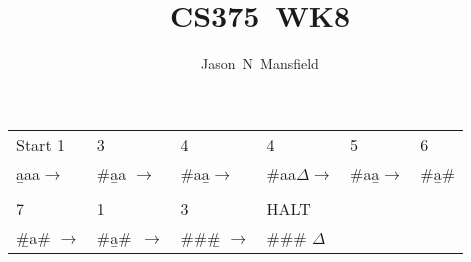 \documentclass[10pt]{article}
\title{CS375~WK8}
\author{Jason~N~Mansfield}
\begin{document}
\section{}
\subsection{}

\begin{tabular}{ l l l l l l }  
  Start 1&3&4&4&5&6           \\         
\b{a}aa$\rightarrow$ & \#\b{a}a $\rightarrow$&\#a\b{a}$\rightarrow$ & \#aa\b{$\Delta$}$\rightarrow$& \#a\b{a}$\rightarrow$&\#\b{a}\#\\
&&&&&\\%
7&1&3&HALT&&\\
\b{\#}a\# $\rightarrow$&\#\b{a}\#\ $\rightarrow$&\#\#\b{\#} $\rightarrow$ & \#\#\# \b{$\Delta$} &&\\
\end{tabular}
\end{document}
